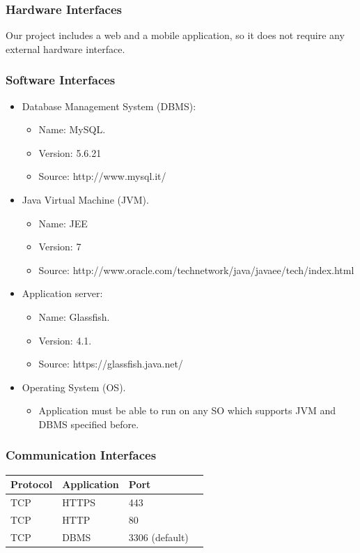 		\subsubsection{Hardware Interfaces}
			Our project includes a web and a mobile application, so it does not require
			any external hardware interface.
		\subsubsection{Software Interfaces}
			\begin{itemize}
				\item Database Management System (DBMS):
				\begin{itemize}
					\item Name: MySQL.
					\item Version: 5.6.21
					\item Source: http://www.mysql.it/
				\end{itemize}
				\item Java Virtual Machine (JVM).
				\begin{itemize}
					\item Name: JEE
					\item Version: 7
					\item Source: http://www.oracle.com/technetwork/java/javaee/tech/index.html
				\end{itemize}
				\item Application server:
				\begin{itemize}
					\item Name: Glassfish.
					\item Version: 4.1.
					\item Source: https://glassfish.java.net/
				\end{itemize}
				\item Operating System (OS).
				\begin{itemize}
					\item Application must be able to run on any SO which supports JVM and DBMS specified before.
				\end{itemize}
			\end{itemize}
		\subsubsection{Communication Interfaces}
			\begin{center}
				\begin{tabular}{ | l | l | l | p{5cm} |}
					\hline
					Protocol & Application & Port 	\\ \hline
					TCP & HTTPS & 443				\\ \hline
					TCP & HTTP  & 80				\\ \hline
					TCP & DBMS  & 3306 (default)	\\ \hline
				\end{tabular}
			\end{center}

